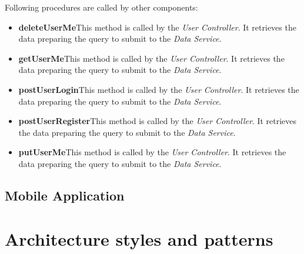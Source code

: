 Following procedures are called by other components:
\begin{itemize}
    \item \textbf{deleteUserMe}\quad This method is called by the \textit{User Controller}. It retrieves the data preparing the query to submit to the \textit{Data Service}.
    \item \textbf{getUserMe}\quad This method is called by the \textit{User Controller}. It retrieves the data preparing the query to submit to the \textit{Data Service}.
    \item \textbf{postUserLogin}\quad This method is called by the \textit{User Controller}. It retrieves the data preparing the query to submit to the \textit{Data Service}.
    \item \textbf{postUserRegister}\quad This method is called by the \textit{User Controller}. It retrieves the data preparing the query to submit to the \textit{Data Service}.
    \item \textbf{putUserMe}\quad This method is called by the \textit{User Controller}. It retrieves the data preparing the query to submit to the \textit{Data Service}.
\end{itemize}

\subsection{Mobile Application}\label{sec:ci_mobile}


\section{Architecture styles and patterns}